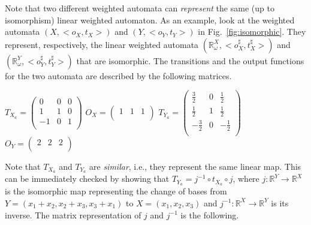\documentclass[3p]{elsarticle}
\newcommand{\cbox}[1]{\vspace{0.2cm}\noindent
  \fbox{\parbox{.97\textwidth}{#1}}\vspace{0.2cm}}
\newcommand{\comp}{\circ}               %
\newcommand{\K}{\mathbb{K}}            %
\newcommand{\reals}{{\mathbb{R}}}              %
\begin{document}
Note that two different weighted automata can {\em represent} the same (up
to isomorphism) linear weighted automaton. As an example, look at
the weighted automata $(X,<o_X, t_X>)$ and $(Y,<o_{Y}, t_{Y}>)$ in
Fig.~\ref{fig:isomorphic}. They represent, respectively, the linear
weighted automata $(\reals_{\omega}^X,<o_X^{\sharp},
t_X^{\sharp}>)$ and $(\reals_{\omega}^Y,<o_{Y}^{\sharp}, t_{Y}^{\sharp}>)$
that are isomorphic. The transitions and the output functions for
the two automata are described by the following matrices.
%
\begin{center}
$T_{X_a}=\left(%
\begin{array}{ccc}
  0 & 0 & 0 \\
  1 & 1 & 0 \\
  -1 & 0 & 1 \\
\end{array}\right)$
$O_X= \left(%
\begin{array}{ccc}
  1 & 1 & 1 \\
\end{array}\right)$\hspace{1cm}
$T_{Y_a}=\left(%
\begin{array}{ccc}
  \frac{3}{2} & 0 & \frac{1}{2} \\
  \frac{1}{2} & 1 & \frac{1}{2} \\
  -\frac{3}{2} & 0 & -\frac{1}{2} \\
\end{array}\right)$
$O_{Y}= \left(%
\begin{array}{ccc}
  2 & 2 &2 \\
\end{array}\right)$
\end{center}
%
%
%
Note that $T_{X_a}$ and $T_{Y_a}$ are \emph{similar}, i.e., they
represent the same linear map. This can be immediately checked by
showing that $T_{Y_a} = j^{-1} \comp t_{X_a}\comp j$, where $j\colon
\reals^{Y} \to \reals^{X}$ is the isomorphic map representing the change of
bases from $Y=(x_1+x_2,x_2+x_3,x_3+x_1)$ to $X=(x_1,x_2,x_3)$ and
$j^{-1}\colon \reals^{X} \to \reals^{Y}$ is its inverse. The matrix
representation of $j$ and $j^{-1}$ is the following.
\end{document}
